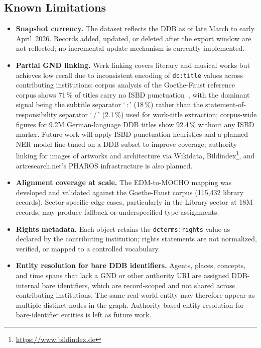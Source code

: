 \subsection{Known Limitations}
\label{sec:quality:limitations}

\begin{itemize}
  \item \textbf{Snapshot currency.} The dataset reflects the DDB as of late March to
        early April~2026. Records added, updated, or deleted after the export window
        are not reflected; no incremental update mechanism is currently implemented.

  \item \textbf{Partial GND linking.} Werk linking covers literary and musical works but achieves low recall due to
        inconsistent encoding of \texttt{dc:title} values across contributing institutions:
        corpus analysis of the Goethe-Faust reference corpus shows 71\,\% of titles
        carry no ISBD punctuation~\cite{ifla2012isbd}, with the dominant signal being
        the subtitle separator `\,:\,' (18\,\%) rather than the statement-of-responsibility
        separator `\,/\,' (2.1\,\%) used for work-title extraction; corpus-wide figures
        for 9.2M German-language DDB titles show 92.4\,\% without any ISBD marker.
        Future work will apply ISBD punctuation heuristics and a planned NER model
        fine-tuned on a DDB subset to improve coverage; authority linking for images
        of artworks and architecture via Wikidata,
        Bildindex\footnote{\url{https://www.bildindex.de}}, and artresearch.net's
        PHAROS infrastructure
        is also planned.

  \item \textbf{Alignment coverage at scale.} The EDM-to-MOCHO mapping was developed
        and validated against the Goethe-Faust corpus (115,432 library records).
        Sector-specific edge cases, particularly in the Library sector at 18M records,
        may produce fallback or underspecified type assignments.

  \item \textbf{Rights metadata.} Each object retains the \texttt{dcterms:rights}
        value as declared by the contributing institution; rights statements are not
        normalized, verified, or mapped to a controlled vocabulary.

  \item \textbf{Entity resolution for bare DDB identifiers.} Agents, places, concepts,
        and time spans that lack a GND or other authority URI are assigned
        DDB-internal bare identifiers, which are record-scoped and not shared across
        contributing institutions. The same real-world entity may therefore appear as
        multiple distinct nodes in the graph. Authority-based entity resolution for
        bare-identifier entities is left as future work.


\end{itemize}
